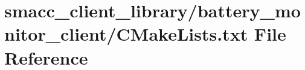 \hypertarget{client__library_2battery__monitor__client_2CMakeLists_8txt}{}\section{smacc\+\_\+client\+\_\+library/battery\+\_\+monitor\+\_\+client/\+C\+Make\+Lists.txt File Reference}
\label{client__library_2battery__monitor__client_2CMakeLists_8txt}
